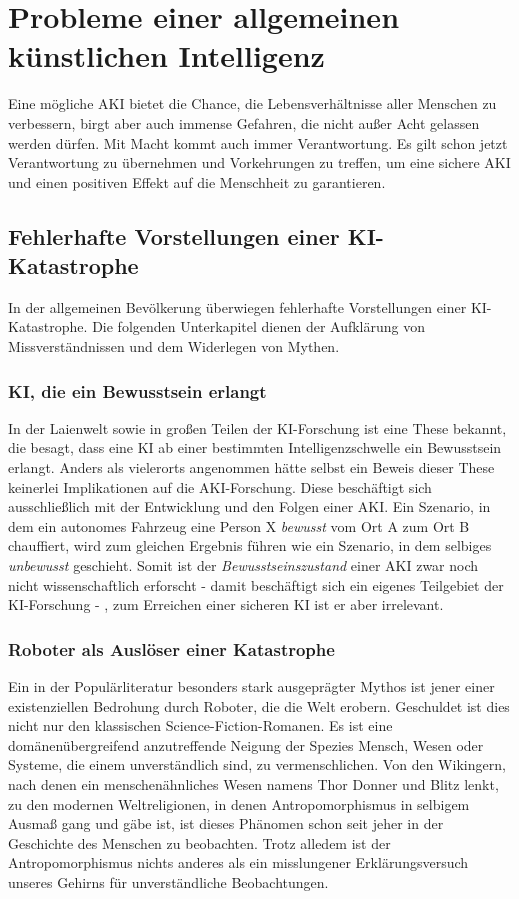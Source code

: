 \chapter{Probleme einer allgemeinen künstlichen Intelligenz}
Eine mögliche AKI bietet die Chance, die Lebensverhältnisse aller Menschen zu verbessern, birgt aber auch immense Gefahren, die nicht außer Acht gelassen werden dürfen. Mit Macht kommt auch immer Verantwortung. Es gilt schon jetzt Verantwortung zu übernehmen und Vorkehrungen zu treffen, um eine sichere AKI und einen positiven Effekt auf die Menschheit zu garantieren.
\section{Fehlerhafte Vorstellungen einer KI-Katastrophe}
In der allgemeinen Bevölkerung überwiegen fehlerhafte Vorstellungen einer KI-Katastrophe. Die folgenden Unterkapitel dienen der Aufklärung von Missverständnissen und dem Widerlegen von Mythen.
\subsection{KI, die ein Bewusstsein erlangt}
In der Laienwelt sowie in großen Teilen der KI-Forschung ist eine These bekannt, die besagt, dass eine KI ab einer bestimmten Intelligenzschwelle ein Bewusstsein erlangt. Anders als vielerorts angenommen hätte selbst ein Beweis dieser These keinerlei Implikationen auf die AKI-Forschung. Diese beschäftigt sich ausschließlich mit der Entwicklung und den Folgen einer AKI. Ein Szenario, in dem ein autonomes Fahrzeug eine Person X \emph{bewusst} vom Ort A zum Ort B chauffiert, wird zum gleichen Ergebnis führen wie ein Szenario, in dem selbiges \emph{unbewusst} geschieht. Somit ist der \emph{Bewusstseinszustand} einer AKI zwar noch nicht wissenschaftlich erforscht - damit beschäftigt sich ein eigenes Teilgebiet der KI-Forschung - , zum Erreichen einer sicheren KI ist er aber irrelevant. 
\subsection{Roboter als Auslöser einer Katastrophe}
Ein in der Populärliteratur besonders stark ausgeprägter Mythos ist jener einer existenziellen Bedrohung durch Roboter, die die Welt erobern. Geschuldet ist dies nicht nur den klassischen Science-Fiction-Romanen. Es ist eine domänenübergreifend anzutreffende Neigung der Spezies Mensch, Wesen oder Systeme, die einem unverständlich sind, zu vermenschlichen. Von den Wikingern, nach denen ein menschenähnliches Wesen namens Thor Donner und Blitz lenkt, zu den modernen Weltreligionen, in denen Antropomorphismus in selbigem Ausmaß gang und gäbe ist, ist dieses Phänomen schon seit jeher in der Geschichte des Menschen zu beobachten. Trotz alledem ist der Antropomorphismus nichts anderes als ein misslungener Erklärungsversuch unseres Gehirns für unverständliche Beobachtungen.

